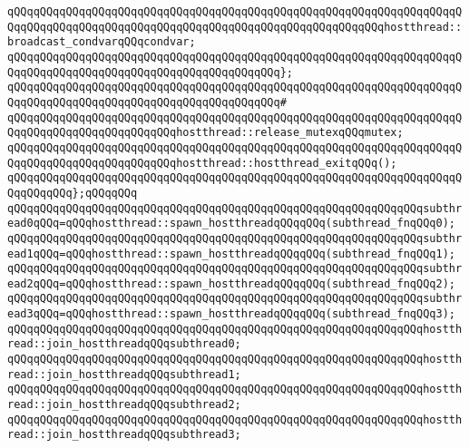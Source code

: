 \newline
\verb|qQQqqQQqqQQqqQQqqQQqqQQqqQQqqQQqqQQqqQQqqQQqqQQqqQQqqQQqqQQqqQQqqQQqqQQqqQQqqQQqqQQqqQQqqQQqqQQqqQQqqQQqqQQqqQQqqQQqqQQqqQQqqQQqhostthread::broadcast_condvarqQQqcondvar;|\newline
\verb|qQQqqQQqqQQqqQQqqQQqqQQqqQQqqQQqqQQqqQQqqQQqqQQqqQQqqQQqqQQqqQQqqQQqqQQqqQQqqQQqqQQqqQQqqQQqqQQqqQQqqQQqqQQqqQQq};|\newline
\verb|qQQqqQQqqQQqqQQqqQQqqQQqqQQqqQQqqQQqqQQqqQQqqQQqqQQqqQQqqQQqqQQqqQQqqQQqqQQqqQQqqQQqqQQqqQQqqQQqqQQqqQQqqQQqqQQq#|\newline
\verb|qQQqqQQqqQQqqQQqqQQqqQQqqQQqqQQqqQQqqQQqqQQqqQQqqQQqqQQqqQQqqQQqqQQqqQQqqQQqqQQqqQQqqQQqqQQqqQQqhostthread::release_mutexqQQqmutex;|\newline
\newline
\verb|qQQqqQQqqQQqqQQqqQQqqQQqqQQqqQQqqQQqqQQqqQQqqQQqqQQqqQQqqQQqqQQqqQQqqQQqqQQqqQQqqQQqqQQqqQQqqQQqhostthread::hostthread_exitqQQq();|\newline
\verb|qQQqqQQqqQQqqQQqqQQqqQQqqQQqqQQqqQQqqQQqqQQqqQQqqQQqqQQqqQQqqQQqqQQqqQQqqQQqqQQq};qQQqqQQq|\newline
\newline
\verb|qQQqqQQqqQQqqQQqqQQqqQQqqQQqqQQqqQQqqQQqqQQqqQQqqQQqqQQqqQQqqQQqsubthread0qQQq=qQQqhostthread::spawn_hostthreadqQQqqQQq(subthread_fnqQQq0);|\newline
\verb|qQQqqQQqqQQqqQQqqQQqqQQqqQQqqQQqqQQqqQQqqQQqqQQqqQQqqQQqqQQqqQQqsubthread1qQQq=qQQqhostthread::spawn_hostthreadqQQqqQQq(subthread_fnqQQq1);|\newline
\verb|qQQqqQQqqQQqqQQqqQQqqQQqqQQqqQQqqQQqqQQqqQQqqQQqqQQqqQQqqQQqqQQqsubthread2qQQq=qQQqhostthread::spawn_hostthreadqQQqqQQq(subthread_fnqQQq2);|\newline
\verb|qQQqqQQqqQQqqQQqqQQqqQQqqQQqqQQqqQQqqQQqqQQqqQQqqQQqqQQqqQQqqQQqsubthread3qQQq=qQQqhostthread::spawn_hostthreadqQQqqQQq(subthread_fnqQQq3);|\newline
\newline
\verb|qQQqqQQqqQQqqQQqqQQqqQQqqQQqqQQqqQQqqQQqqQQqqQQqqQQqqQQqqQQqqQQqhostthread::join_hostthreadqQQqsubthread0;|\newline
\verb|qQQqqQQqqQQqqQQqqQQqqQQqqQQqqQQqqQQqqQQqqQQqqQQqqQQqqQQqqQQqqQQqhostthread::join_hostthreadqQQqsubthread1;|\newline
\verb|qQQqqQQqqQQqqQQqqQQqqQQqqQQqqQQqqQQqqQQqqQQqqQQqqQQqqQQqqQQqqQQqhostthread::join_hostthreadqQQqsubthread2;|\newline
\verb|qQQqqQQqqQQqqQQqqQQqqQQqqQQqqQQqqQQqqQQqqQQqqQQqqQQqqQQqqQQqqQQqhostthread::join_hostthreadqQQqsubthread3;|\newline
